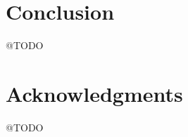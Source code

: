 \documentclass[a4paper,11pt,abstracton,hidelinks]{scrartcl}
\begin{document}
\section{Conclusion}


@TODO


\section{Acknowledgments}


@TODO


\printbibliography
\end{document}
